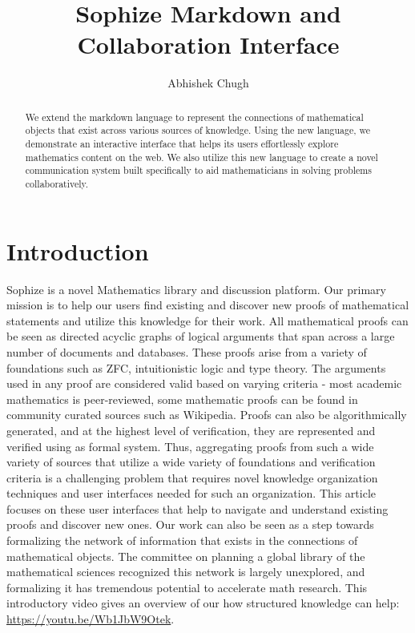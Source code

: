 \documentclass[a4paper]{article}
\title{Sophize Markdown and Collaboration Interface }
\author{
Abhishek Chugh
}
\begin{document}
\maketitle

\begin{abstract}
We extend the markdown language to represent the connections of mathematical objects that exist across various sources of knowledge. Using the new language, we demonstrate an interactive interface that helps its users effortlessly explore mathematics content on the web. We also utilize this new language to create a novel communication system built specifically to aid mathematicians in solving problems collaboratively.

\end{abstract}

\vskip 32pt

 

\section{Introduction}


Sophize is a novel Mathematics library and discussion platform. Our primary mission is to help our users find existing and discover new proofs of mathematical statements and utilize this knowledge for their work. All mathematical proofs can be seen as directed acyclic graphs of logical arguments that span across a large number of documents and databases. These proofs arise from a variety of foundations such as ZFC, intuitionistic logic and type theory. The arguments used in any proof are considered valid based on varying criteria - most academic mathematics is peer-reviewed, some mathematic proofs can be found in community curated sources such as Wikipedia. Proofs can also be algorithmically generated, and at the highest level of verification, they are represented and verified using as formal system. Thus, aggregating proofs from such a wide variety of sources that utilize a wide variety of foundations and verification criteria is a challenging problem that requires novel knowledge organization techniques and user interfaces needed for such an organization. This article focuses on these user interfaces that help to navigate and understand existing proofs and discover new ones.  Our work can also be seen as a step towards formalizing the network of information that exists in the connections of mathematical objects. The committee on planning a global library of the mathematical sciences recognized this network is largely unexplored, and formalizing it has tremendous potential to accelerate math research\cite{sciences2014developing}. This introductory video gives an overview of our how structured knowledge can help: \url{https://youtu.be/Wb1JbW9Otek}.
\end{document}
